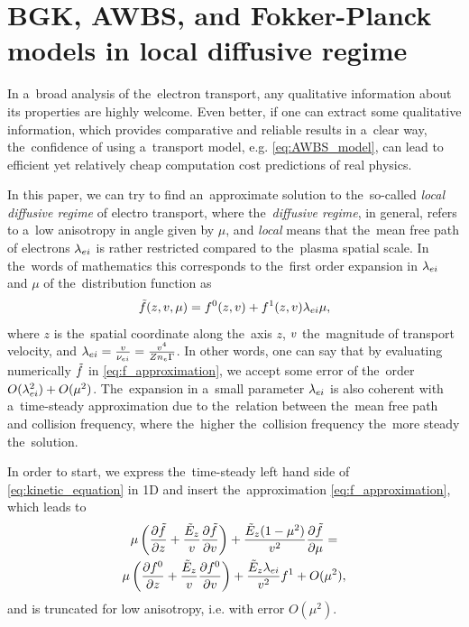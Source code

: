 \section{BGK, AWBS, and Fokker-Planck models in local diffusive regime}
\label{sec:DiffusiveKinetics}

In a~broad analysis of the~electron transport, any qualitative information
about its properties are highly welcome. Even better, if one can extract some 
qualitative information, which provides comparative and reliable results in 
a~clear way, the~confidence of using a~transport model, 
e.g. \eqref{eq:AWBS_model}, can lead to efficient yet relatively
cheap computation cost predictions of real physics.

In this paper, we can try to find an~approximate solution to the~so-called
\textit{local diffusive regime} of electro transport, 
where the~\textit{diffusive regime}, in general, refers to a~low anisotropy 
in angle given by $\mu$, and \textit{local} means that the~mean free path of 
electrons $\lambda_{ei}$ is rather restricted compared to the~plasma spatial scale. 
In the~words of mathematics this corresponds to the~first 
order expansion in $\lambda_{ei}$ and $\mu$ of the~distribution function as
\begin{equation}
  \tilde{f}(z, v, \mu) = f^0(z, v) + f^1(z, v) \lambda_{ei}\mu ,
  \label{eq:f_approximation}
\end{equation}
where $z$ is the~spatial coordinate along the~axis $z$, $v$ the~magnitude 
of transport velocity, and 
$\lambda_{ei} = \frac{v}{\nu_{ei}} = \frac{v^4}{Z n_e \Gamma}$.
In other words, one can say that by evaluating numerically $\tilde{f}$
in \eqref{eq:f_approximation}, we accept some error of the~order 
$O(\lambda_{ei}^2) + O(\mu^2)$. The~expansion in a~small parameter $\lambda_{ei}$ is also
coherent with a~time-steady approximation due to the~relation between the~mean
free path and collision frequency, where the~higher the~collision frequency 
the~more steady the~solution. 

In order to start, we express the~time-steady left hand side of 
\eqref{eq:kinetic_equation}
in 1D and insert the~approximation \eqref{eq:f_approximation}, which leads to
\begin{multline}
  \mu\left(\frac{\partial{\tilde{f}}}{\partial{z}} + \frac{\tilde{E}_z}{v}\frac{\partial{\tilde{f}}}{\partial{v}}\right) 
  + \frac{\tilde{E}_z(1-\mu^2)}{v^2}\frac{\partial{\tilde{f}}}{\partial{\mu}} = \\
  \mu\left(\frac{\partial{f^0}}{\partial{z}} + \frac{\tilde{E}_z}{v}\frac{\partial{f^0}}{\partial{v}}\right) 
  + \frac{\tilde{E}_z\lambda_{ei}}{v^2} f^1 + O(\mu^2) ,
  \label{eq:LHS_kinetic_equation}
\end{multline}
and is truncated for low anisotropy, i.e. with error $O(\mu^2)$.

